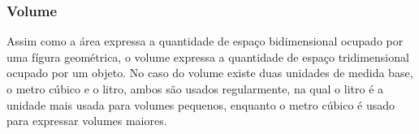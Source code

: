 \begin{multicols*}{2}
    \begin{table}[H]
    \end{table}

    \subsubsection*{Volume}
    Assim como a área expressa a quantidade de espaço bidimensional ocupado por uma fígura geométrica, o volume expressa
    a quantidade de espaço tridimensional ocupado por um objeto. No caso do volume existe duas unidades de medida base,
    o metro cúbico e o litro, ambos são usados regularmente, na qual o litro é a unidade mais usada para volumes
    pequenos, enquanto o metro cúbico é usado para expressar volumes maiores.


\end{multicols*}
